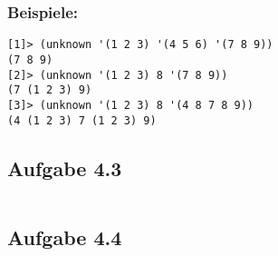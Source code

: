 \documentclass[a4paper, 12pt]{article}
\begin{document}
\subsubsection*{Beispiele:}
\begin{verbatim}
[1]> (unknown '(1 2 3) '(4 5 6) '(7 8 9))
(7 8 9)
[2]> (unknown '(1 2 3) 8 '(7 8 9))
(7 (1 2 3) 9)
[3]> (unknown '(1 2 3) 8 '(4 8 7 8 9))
(4 (1 2 3) 7 (1 2 3) 9)
\end{verbatim}

\subsection*{Aufgabe 4.3}
\inputminted[]{common-lisp}{kreis.lisp}

\subsection*{Aufgabe 4.4}
\inputminted[]{common-lisp}{mylast.lisp}
\inputminted[]{common-lisp}{mylastlist.lisp}
\end{document}
